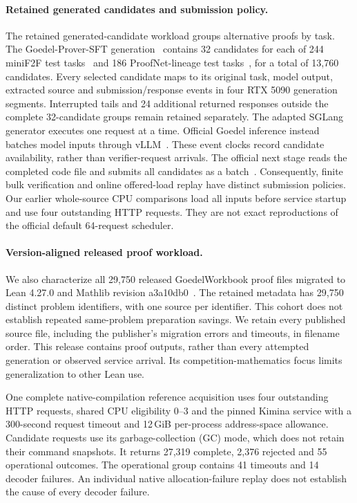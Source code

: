 \documentclass[10pt,twocolumn]{article}
\begin{document}
\paragraph{Retained generated candidates and submission policy.}
The retained generated-candidate workload groups alternative proofs by task. The Goedel-Prover-SFT generation~\cite{goedelInference} contains 32 candidates for each of
244 miniF2F test tasks~\cite{minif2f} and 186 ProofNet-lineage test tasks~\cite{proofnetSource,goedelProofnet}, for a total of 13,760 candidates.
Every selected candidate maps to its original task, model output, extracted
source and submission/response events in four RTX 5090 generation segments.
Interrupted tails and 24 additional returned responses outside the complete
32-candidate groups remain retained separately.
The adapted SGLang~\cite{sglangSource} generator executes one request at a time. Official
Goedel inference instead batches model inputs through vLLM~\cite{goedelInference,vllmSource}.
These event clocks record candidate availability, rather than verifier-request
arrivals. The official next stage reads the completed code file and submits
all candidates as a batch~\cite{goedelCompile}.
Consequently, finite bulk verification and online offered-load replay have
distinct submission policies. Our earlier whole-source CPU comparisons load all inputs
before service startup and use four outstanding HTTP requests. They are not
exact reproductions of the official default 64-request scheduler.

\paragraph{Version-aligned released proof workload.}
We also characterize all 29,750 released GoedelWorkbook proof files migrated to
Lean 4.27.0 and Mathlib revision a3a10db0~\cite{goedelWorkbook427}.
The retained metadata has 29,750 distinct problem identifiers, with one
source per identifier. This cohort does not establish repeated same-problem
preparation savings.
We retain every published source file, including the publisher's migration
errors and timeouts, in filename order. This release contains proof outputs,
rather than every attempted generation or observed service arrival.
Its competition-mathematics focus limits generalization to other Lean use.

One complete native-compilation reference acquisition uses four outstanding
HTTP requests, shared CPU eligibility 0--3 and the pinned Kimina service with a
300-second request timeout and 12\,GiB per-process address-space allowance.
Candidate requests use its garbage-collection (GC) mode, which does not retain
their command snapshots.
It returns 27,319 complete, 2,376 rejected and 55 operational outcomes.
The operational group contains 41 timeouts and 14 decoder failures. An
individual native allocation-failure replay does not establish the cause
of every decoder failure.
\end{document}
